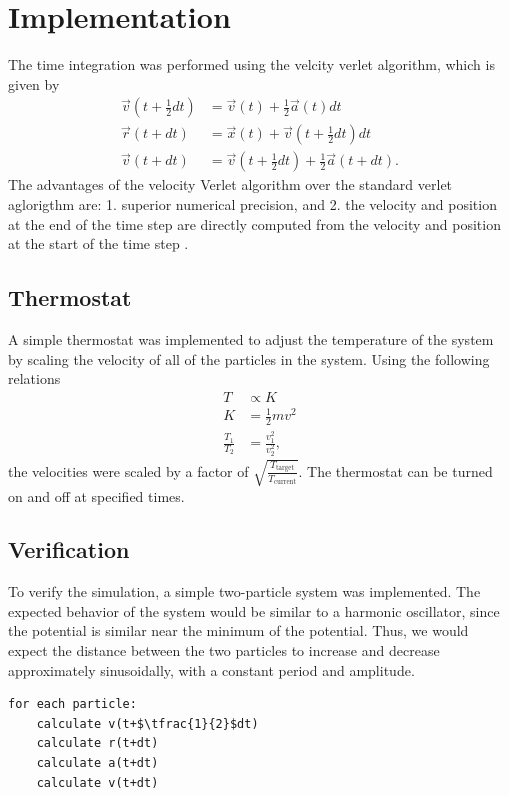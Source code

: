 \documentclass[]{article}
\begin{document}
\section{Implementation}
The time integration was performed using the velcity verlet algorithm, which is given by
\begin{align*}
\vec{v}(t + \tfrac{1}{2} dt) & = \vec{v}(t)                   + \tfrac{1}{2} \vec{a}(t) dt      \\
\vec{r}(t + dt)              & = \vec{x}(t)                   + \vec{v}(t + \tfrac{1}{2} dt) dt \\
\vec{v}(t + dt)              & = \vec{v}(t + \tfrac{1}{2} dt) + \tfrac{1}{2} \vec{a}(t + dt) .
\end{align*}
The advantages of the velocity Verlet algorithm over the standard verlet aglorigthm are:
1. superior numerical precision, and
2. the velocity and position at the end of the time step are directly computed from the velocity and position at the start of the time step \cite{swope1982}.

\subsection{Thermostat}
A simple thermostat was implemented to adjust the temperature of the system by scaling the velocity of all of the particles in the system.
Using the following relations
\begin{align*}
T &\propto K \\
K &= \frac{1}{2} m v^{2} \\
\frac{T_{1}}{T_{2}} &= \frac{v_{1}^{2}}{v_{2}^{2}} ,
\end{align*}
the velocities were scaled by a factor of $\sqrt{\frac{T_{\mathrm{target}}}{T_{\mathrm{current}}}}$.
The thermostat can be turned on and off at specified times.

\subsection{Verification}
To verify the simulation, a simple two-particle system was implemented.
The expected behavior of the system would be similar to a harmonic oscillator, since the potential is similar near the minimum of the potential.
Thus, we would expect the distance between the two particles to increase and decrease approximately sinusoidally, with a constant period and amplitude.

\begin{lstlisting}[mathescape]
for each particle:
	calculate v(t+$\tfrac{1}{2}$dt)
	calculate r(t+dt)
	calculate a(t+dt)
	calculate v(t+dt)
\end{lstlisting}
\end{document}
